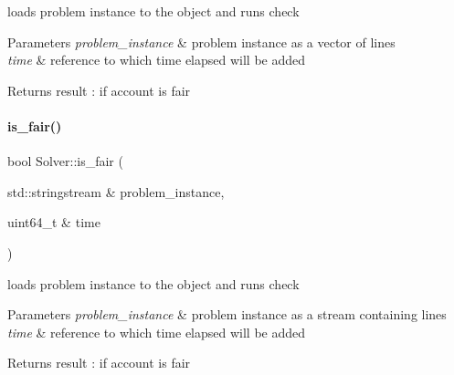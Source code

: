 loads problem instance to the object and runs check 

\begin{DoxyParams}{Parameters}
{\em problem\+\_\+instance} & problem instance as a vector of lines \\
\hline
{\em time} & reference to which time elapsed will be added \\
\hline
\end{DoxyParams}
\begin{DoxyReturn}{Returns}
result \+: if account is fair 
\end{DoxyReturn}
\mbox{\label{classSolver_a3583436284fe72faf2459461ad6de65c}} 
\paragraph{\texorpdfstring{is\+\_\+fair()}{is\_fair()}\hspace{0.1cm}{\footnotesize\ttfamily [2/2]}}
{\footnotesize\ttfamily bool Solver\+::is\+\_\+fair (\begin{DoxyParamCaption}\item[{std\+::stringstream \&}]{problem\+\_\+instance,  }\item[{uint64\+\_\+t \&}]{time }\end{DoxyParamCaption})}

loads problem instance to the object and runs check 

\begin{DoxyParams}{Parameters}
{\em problem\+\_\+instance} & problem instance as a stream containing lines \\
\hline
{\em time} & reference to which time elapsed will be added \\
\hline
\end{DoxyParams}
\begin{DoxyReturn}{Returns}
result \+: if account is fair 
\end{DoxyReturn}